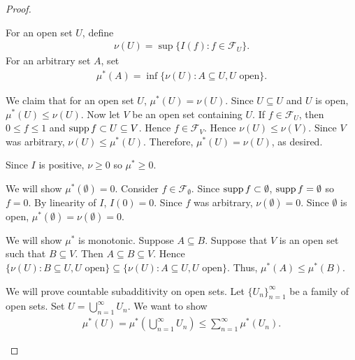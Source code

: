 \begin{proof}
\setcounter{step}{0}
\begin{step}
For an open set $U$, define \begin{align*}
    \nu(U) = \sup \{ I(f) : f \in \mathcal{F}_{U} \}.
\end{align*}
For an arbitrary set $A$, set \begin{align*}
    \mu^{\ast}(A) = \inf \{ \nu(U) : A \subseteq U, U \text{ open} \}.
\end{align*}

We claim that for an open set $U$, $\mu^{\ast} (U) = \nu(U)$.
Since $U \subseteq U$ and $U$ is open, $\mu^{\ast}(U) \leq \nu(U)$. Now let $V$ be an open set containing $U$. If $f \in \mathcal{F}_{U}$, then $0 \leq f \leq 1$ and $\operatorname{supp} f \subset U \subseteq V$. Hence $f \in \mathcal{F}_{V}$. Hence $\nu(U) \leq \nu(V)$. Since $V$ was arbitrary,
$\nu(U) \leq \mu^{\ast}(U)$. Therefore, $\mu^{\ast}(U) = \nu(U)$, as desired.
\end{step}

\begin{step}

Since $I$ is positive, $\nu \geq 0$ so $\mu^{\ast} \geq 0$.

We will show $\mu^{\ast}(\emptyset) = 0$. Consider $f \in \mathcal{F}_\emptyset$. Since $\operatorname{supp} f \subset \emptyset$, $\operatorname{supp} f = \emptyset$ so $f = 0$. By linearity of $I$, $I(0) = 0$. Since $f$ was arbitrary, $\nu(\emptyset) = 0$. Since $\emptyset$ is open, $\mu^{\ast}(\emptyset) = \nu(\emptyset) = 0$.

We will show $\mu^\ast$ is monotonic.
Suppose $A \subseteq B$. Suppose that $V$ is an open set such that $B \subseteq V$. Then $A \subseteq B \subseteq V$. Hence $ \{ \nu(U) : B \subseteq U, U \text{ open} \} \subseteq \{ \nu(U) : A \subseteq U, U \text { open} \}$. Thus, $\mu^{\ast}(A) \leq \mu^{\ast}(B)$.

We will prove countable subadditivity on open sets.
Let $\{ U_n \}_{n = 1}^{\infty}$ be a family of open sets. Set $U = \bigcup_{n=1}^{\infty} U_n$.
We want to show \begin{align}
    \label{eqn:fcs:rrt:outer:u:goal}
    \mu^{\ast} (U) =  \mu^{\ast} \left (\bigcup_{n=1}^{\infty} U_n 
    \right ) \leq \sum_{n = 1}^{\infty} \mu^{\ast}(U_n).
\end{align}


\end{step}
\end{proof}
